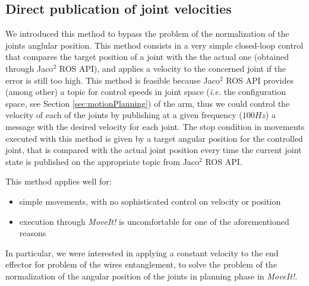 \subsection{Direct publication of joint velocities}
We introduced this method to bypass the problem of the normalization of the joints anglular position. This method consists in a very simple closed-loop control that compares the target position of a joint with the the actual one (obtained through Jaco$^2$ \ac{ROS} \ac{API}), and applies a velocity to the concerned joint if the error is still too high. This method is feasible because Jaco$^2$ \ac{ROS} \ac{API} provides (among other) a topic for control speeds in joint space (\textit{i.e.} the configuration space, see Section \ref{sec:motionPlanning}) of the arm, thus we could control the velocity of each of the joints by publishing at a given frequency ($100Hz$) a message with the desired velocity for each joint. The stop condition in movements executed with this method is given by a target angular position for the controlled joint, that is compared with the actual joint position every time the current joint state is published on the appropriate topic from Jaco$^2$ \ac{ROS} \ac{API}.

This method applies well for:
\begin{itemize}
	\item simple movements, with no sophisticated control on velocity or position
	\item execution through \textit{MoveIt!} is uncomfortable for one of the aforementioned reasons
\end{itemize}
In particular, we were interested in applying a constant velocity to the end effector for problem of the wires entanglement, to solve the problem of the normalization of the angular position of the joints in planning phase in \textit{MoveIt!}.

